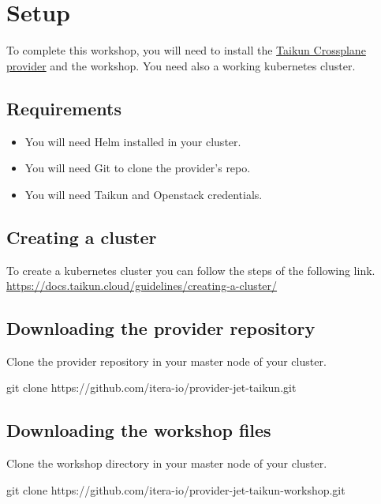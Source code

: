 \section{Setup}\label{sec:setup}

To complete this workshop, you will need to install the \href{https://github.com/itera-io/provider-jet-taikun}{Taikun Crossplane provider} and the workshop. You need also a working kubernetes cluster.

\subsection{Requirements}
\begin{itemize}
  \item You will need Helm installed in your cluster.
  \item You will need Git to clone the provider's repo.
  \item You will need Taikun and Openstack credentials.
\end{itemize}

\subsection{Creating a cluster}
To create a kubernetes cluster you can follow the steps of the following link.
\href{https://docs.taikun.cloud/guidelines/creating-a-cluster/}{https://docs.taikun.cloud/guidelines/creating-a-cluster/}

\subsection{Downloading the provider repository}
Clone the provider repository in your master node of your cluster.
\begin{shell}
git clone https://github.com/itera-io/provider-jet-taikun.git  
\end{shell}


\subsection{Downloading the workshop files}
Clone the workshop directory in your master node of your cluster.
\begin{shell}
git clone https://github.com/itera-io/provider-jet-taikun-workshop.git
\end{shell}